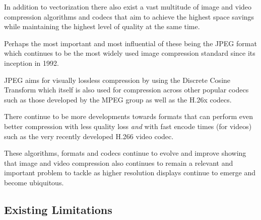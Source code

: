 \documentclass[12pt]{article}
\newcommand{\sentence}{} %
\newcommand{\italic}[1]{\textit{#1}}
\begin{document}
    \bigskip
    In addition to vectorization there also exist a vast multitude of image and video compression algorithms and
    codecs that aim to achieve the highest space savings while maintaining the highest level of quality at the same
    time.
    \sentence
    Perhaps the most important and most influential of these being the JPEG format which continues to be the most
    widely used image compression standard since its inception in 1992.
    \sentence
    JPEG aims for visually lossless compression by using the Discrete Cosine Transform which itself is also used for
    compression across other popular codecs such as those developed by the MPEG group as well as the H.26x codecs.
    \sentence
    There continue to be more developments towards formats that can perform even better compression with less quality
    loss \italic{and} with fast encode times (for videos) such as the very recently developed H.266 video codec.
    \sentence
    These algorithms, formats and codecs continue to evolve and improve showing that image and video compression also
    continues to remain a relevant and important problem to tackle as higher resolution displays continue to emerge
    and become ubiquitous.

    \subsection{Existing Limitations}\label{subsec:existing-limitations}
\end{document}
